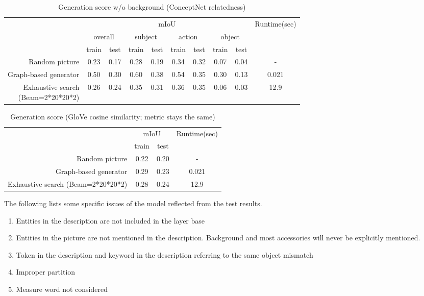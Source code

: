 \documentclass{article} %
\begin{document}
\begin{table}[htbp]
	\caption{Generation score w/o background (ConceptNet relatedness)}
	\centering
	\begin{tabular}{rccccccccc}
		\toprule
				 & \multicolumn{8}{c}{mIoU} & \multirow{3}{*}{Runtime(sec)}\\
		\cmidrule{2-9}
				 & \multicolumn{2}{c}{overall} & \multicolumn{2}{c}{subject} & \multicolumn{2}{c}{action} & \multicolumn{2}{c}{object} & \\
		\cmidrule{2-3}\cmidrule{4-5}\cmidrule{6-7}\cmidrule{8-9}
				 & train &  test &  train &  test &  train &  test &  train &  test & \\
		\midrule
		Random picture
				& 0.23 & 0.17 & 0.28 & 0.19 & 0.34 & 0.32 & 0.07 & 0.04 &   - \\
		Graph-based generator
				& 0.50 & 0.30 & 0.60 & 0.38 & 0.54 & 0.35 & 0.30 & 0.13 & 0.021  \\
				\makecell{Exhaustive search\\(Beam=2*20*20*2)}
				& 0.26 & 0.24 & 0.35 & 0.31 & 0.36 & 0.35 & 0.06 & 0.03 & 12.9\\
		\bottomrule
	\end{tabular}%
	\label{tab: feat}
\end{table}


\begin{table}[htbp]
	\caption{Generation score (GloVe cosine similarity; metric stays the same)}
	\centering
	\begin{tabular}{rccc}
		\toprule
				 & \multicolumn{2}{c}{mIoU} & \multirow{2}{*}{Runtime(sec)}\\
		\cmidrule{2-3}
				 & train &  test & \\
		\midrule
		Random picture & 0.22 & 0.20 &  - \\   
		Graph-based generator & 0.29 & 0.23 & 0.021\\
		Exhaustive search (Beam=2*20*20*2) & 0.28 & 0.24 & 12.9\\
		\bottomrule
	\end{tabular}%
	\label{tab: feat}
\end{table}

The following lists some specific issues of the model reflected from the test results. 
\begin{enumerate}
	\item Entities in the description are not included in the layer base
	\item Entities in the picture are not mentioned in the description. Background and most accessories will never be explicitly mentioned. 
	\item Token in the description and keyword in the description referring to the same object mismatch
	\item Improper partition
	\item Measure word not considered
\end{enumerate}
\end{document}
